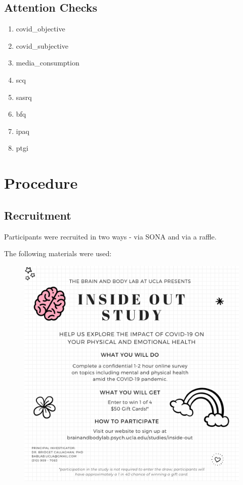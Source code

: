 \documentclass[]{book}
\providecommand{\tightlist}{%
  \setlength{\itemsep}{0pt}\setlength{\parskip}{0pt}}
\begin{document}
\hypertarget{attention-checks}{%
\subsection{Attention Checks}\label{attention-checks}}

\begin{enumerate}
\def\labelenumi{\arabic{enumi}.}
\tightlist
\item
  covid\_objective
\item
  covid\_subjective
\item
  media\_consumption
\item
  scq
\item
  sasrq
\item
  bfq
\item
  ipaq
\item
  ptgi
\end{enumerate}

\hypertarget{procedure-1}{%
\section{Procedure}\label{procedure-1}}

\hypertarget{recruitment}{%
\subsection{Recruitment}\label{recruitment}}

Participants were recruited in two ways - via SONA and via a raffle.

The following materials were used:

\begin{figure}
\centering
\includegraphics{images/inside_out_instagram.png}
\caption{}
\end{figure}
\end{document}
